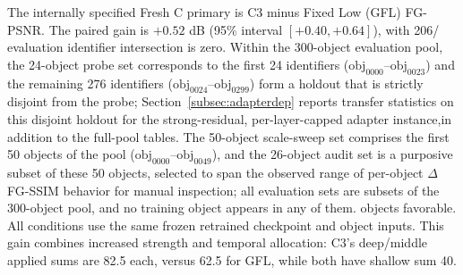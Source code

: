 \documentclass[times,twocolumn,final]{elsarticle}
\providecommand{\DIFadd}[1]{{\protect\color{blue} \sf #1}} %
\providecommand{\DIFdel}[1]{{\protect\color{red} \scriptsize #1}} %
\providecommand{\DIFaddbegin}{} %
\providecommand{\DIFaddend}{} %
\providecommand{\DIFdelbegin}{} %
\providecommand{\DIFdelend}{} %
\begin{document}
\DIFadd{The internally specified Fresh C primary is C3 minus Fixed Low (GFL) FG-PSNR. The paired gain is $+0.52$ dB (95\% interval $[+0.40,+0.64]$), with 206}\DIFaddend /\DIFdelbegin \DIFdel{evaluation identifier intersection is zero. Within the 300-object evaluation pool, the 24-object probe set corresponds to the first 24 identifiers ($\mathrm{obj}_{0000}$--$\mathrm{obj}_{0023}$) and the remaining 276 identifiers ($\mathrm{obj}_{0024}$--$\mathrm{obj}_{0299}$) form a holdout that is strictly disjoint from the probe; Section~\ref{subsec:adapterdep} reports transfer statistics on this disjoint holdout for the strong-residual, per-layer-capped adapter instance,in addition to the full-pool tables.
The 50-object scale-sweep set comprises the first 50 objects of the pool ($\mathrm{obj}_{0000}$--$\mathrm{obj}_{0049}$), and the 26-object audit set is a purposive subset of these 50 objects, selected to span the observed range of per-object $\Delta$FG-SSIM behavior for manual inspection; all evaluation sets are subsets of the 300-object pool, and no training object appears in any of them. }\DIFdelend \DIFaddbegin \DIFadd{300 objects favorable. All conditions use the same frozen retrained checkpoint and object inputs. This gain combines increased strength and temporal allocation: C3's deep/middle applied sums are 82.5 each, versus 62.5 for GFL, while both have shallow sum 40.
}\DIFaddend 
\end{document}
